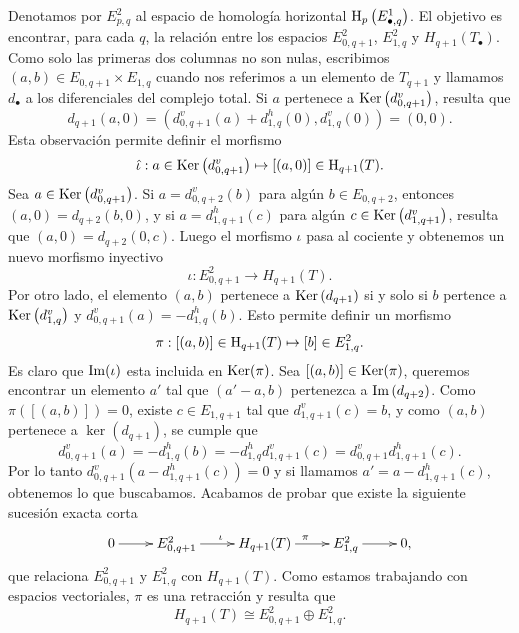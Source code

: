 \documentclass[a4paper,oneside,fleqn,11pt,../tesis.tex]{subfiles}
\begin{document}
Denotamos por $E_{p, q}^2$ al espacio de homología horizontal $\operatorname{H}_{p}\left(E_{\bullet, q}^{1}\right)$. El objetivo
es encontrar, para cada $q$, la relación entre los espacios $E_{0, q + 1}^{2}$,  $E_{1, q}^{2}$ y $H_{q + 1}(T_{\bullet})$.
Como solo las primeras dos columnas no son nulas, escribimos $(a, b) \in E_{0, q + 1} \times E_{1, q}$ cuando nos referimos
a un elemento de $T_{q + 1}$ y llamamos $d_{\bullet}$ a los diferenciales del complejo total.
Si $a$ pertenece a $\operatorname{Ker}\left(d_{0,q + 1}^{v}\right)$, resulta que
\[
    d_{q + 1}(a, 0) = \left(d_{0, q + 1}^{v}(a) + d_{1, q}^{h}(0), d_{1, q}^{v}(0)\right) = (0, 0).
\]
Esta observación permite definir el morfismo
\[
    \hat{\iota}: a \in \operatorname{Ker}\left(d_{0,q + 1}^{v}\right) \mapsto  [(a, 0)] \in \operatorname{H}_{q + 1}(T).
\]
Sea $a \in \operatorname{Ker}\left(d_{0,q + 1}^{v}\right)$. Si $a = d_{0, q + 2}^{v}(b)$ para algún $b \in E_{0, q + 2}$, entonces $(a, 0) = d_{q + 2}(b, 0)$,
y si $a = d_{1, q + 1}^{h}(c)$ para algún $c \in \operatorname{Ker}\left(d_{1, q + 1}^{v}\right)$, resulta que $(a, 0) = d_{q + 2}(0, c)$. Luego 
el morfismo $\hat{\iota}$ pasa al cociente y obtenemos un nuevo morfismo inyectivo
\[
    \iota: E_{0, q + 1}^{2} \to H_{q + 1}(T).
\]
Por otro lado, el elemento $(a, b)$ pertenece a $\operatorname{Ker}\left(d_{q + 1}\right)$ si y solo si $b$ pertence a $\operatorname{Ker}\left(d_{1, q}^{v}\right)$
y $d_{0, q + 1}^{v}(a) = - d_{1, q}^{h}(b)$. Esto permite definir un morfismo
\[
    \pi: [(a, b)] \in \operatorname{H}_{q + 1}(T)  \mapsto  [b] \in E_{1, q}^{2}.
\]
Es claro que $\operatorname{Im}(\iota)$ esta incluida en $\operatorname{Ker}(\pi)$. Sea $[(a, b)] \in \operatorname{Ker}(\pi)$, queremos encontrar un elemento $a'$ tal que
$(a' - a, b)$ pertenezca a $\operatorname{Im}\left(d_{q + 2}\right)$. Como $\pi([(a, b)]) = 0$, existe $c \in E_{1, q + 1}$ tal que $d_{1, q + 1}^{v}(c) = b$,
y como $(a, b)$ pertenece a $\ker(d_{q + 1})$, se cumple que
\[
    d_{0, q + 1}^{v}(a) = -d_{1, q}^{h}(b) = -d_{1, q}^{h} d_{1, q + 1}^{v}(c) = d_{0, q + 1}^{v} d_{1, q+ 1}^{h}(c).
\]
Por lo tanto $d_{0, q + 1}^{v} \left(a - d_{1, q+ 1}^{h}(c)\right) = 0$ y si llamamos $a' = a - d_{1, q+ 1}^{h}(c)$, obtenemos lo que buscabamos.
Acabamos de probar que existe la siguiente sucesión exacta corta
\begin{align*}
\xymatrix{
    0 \ar[r] & E_{0, q + 1}^{2} \ar[r]^{\iota} & H_{q + 1}(T) \ar[r]^{\pi} & E_{1, q }^{2} \ar[r] & 0,
}
\end{align*}
que relaciona $E_{0, q + 1}^{2}$ y $E_{1, q}^{2}$ con $H_{q + 1}(T)$. Como estamos trabajando con espacios vectoriales, $\pi$ es una retracción y
resulta que
\[
    H_{q + 1}(T) \cong E_{0, q + 1}^{2} \oplus E_{1, q}^{2}.
\]
\end{document}

